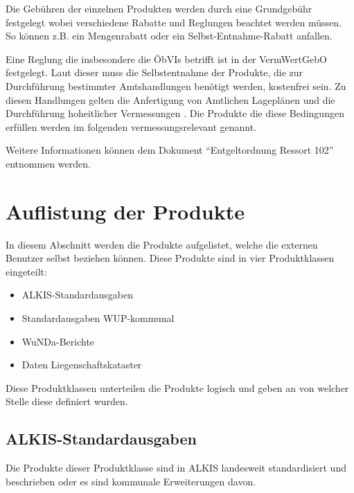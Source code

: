 Die Gebühren der einzelnen Produkten werden durch eine Grundgebühr festgelegt wobei verschiedene Rabatte und Reglungen beachtet werden müssen. So können z.B. ein Mengenrabatt oder ein Selbst-Entnahme-Rabatt anfallen. 

Eine Reglung die insbesondere die \acp{ÖbVI} betrifft ist in der \ac{VermWertGebO} festgelegt. Laut dieser muss die Selbstentnahme der Produkte, die zur Durchführung bestimmter Amtshandlungen benötigt werden, kostenfrei sein. Zu diesen Handlungen gelten die Anfertigung von Amtlichen Lageplänen und die Durchführung hoheitlicher Vermessungen \autocite[vgl.][]{wupp-wunda-oebvi}. Die Produkte die diese Bedingungen erfüllen werden im folgenden vermessungsrelevant genannt.

Weitere Informationen können dem Dokument "`Entgeltordnung Ressort 102"' \autocite{wupp-entgelt} entnommen werden.

\section{Auflistung der Produkte} \label{sec:produktliste}
In diesem Abschnitt werden die Produkte aufgelistet, welche die externen Benutzer selbst beziehen können. Diese Produkte sind in vier Produktklassen eingeteilt:
\begin{itemize}
	\item ALKIS-Standardausgaben
	\item Standardausgaben WUP-kommunal
	\item WuNDa-Berichte
	\item Daten Liegenschaftskataster
\end{itemize}
Diese Produktklassen unterteilen die Produkte logisch und geben an von welcher Stelle diese definiert wurden. 

\subsection{ALKIS-Standardausgaben}

Die Produkte dieser Produktklasse sind in \acs{ALKIS} landesweit standardisiert und beschrieben oder es sind kommunale Erweiterungen davon.

